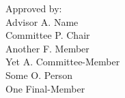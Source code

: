 \begin{titlepage}
\vspace{1in}
\begin{flushright}
\begin{minipage}[t]{2in}
Approved by:\\
Advisor A. Name \\
Committee P. Chair \\
Another F. Member \\
Yet A. Committee-Member \\
Some O. Person \\
One Final-Member
\end{minipage}
\end{flushright}

\end{titlepage}
